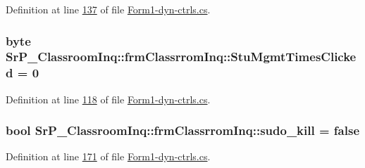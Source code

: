 \-Definition at line \hyperlink{_form1-dyn-ctrls_8cs_source_l00137}{137} of file \hyperlink{_form1-dyn-ctrls_8cs_source}{\-Form1-\/dyn-\/ctrls.\-cs}.

\hypertarget{class_sr_p___classroom_inq_1_1frm_classrrom_inq_a8746b34d859922daf9b2d5b00cef317e}{
\subsubsection[{\-Stu\-Mgmt\-Times\-Clicked}]{\setlength{\rightskip}{0pt plus 5cm}byte {\bf \-Sr\-P\-\_\-\-Classroom\-Inq\-::frm\-Classrrom\-Inq\-::\-Stu\-Mgmt\-Times\-Clicked} = 0}}
\label{class_sr_p___classroom_inq_1_1frm_classrrom_inq_a8746b34d859922daf9b2d5b00cef317e}


\-Definition at line \hyperlink{_form1-dyn-ctrls_8cs_source_l00118}{118} of file \hyperlink{_form1-dyn-ctrls_8cs_source}{\-Form1-\/dyn-\/ctrls.\-cs}.

\hypertarget{class_sr_p___classroom_inq_1_1frm_classrrom_inq_a3ac2217a30904b65be786ee00a312fea}{
\subsubsection[{sudo\-\_\-kill}]{\setlength{\rightskip}{0pt plus 5cm}bool {\bf \-Sr\-P\-\_\-\-Classroom\-Inq\-::frm\-Classrrom\-Inq\-::sudo\-\_\-kill} = false}}
\label{class_sr_p___classroom_inq_1_1frm_classrrom_inq_a3ac2217a30904b65be786ee00a312fea}


\-Definition at line \hyperlink{_form1-dyn-ctrls_8cs_source_l00171}{171} of file \hyperlink{_form1-dyn-ctrls_8cs_source}{\-Form1-\/dyn-\/ctrls.\-cs}.

